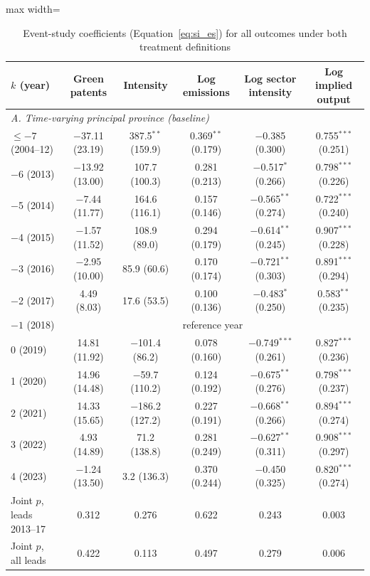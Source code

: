 \begin{table}[htbp]\centering\scriptsize
\caption{Event-study coefficients (Equation~\ref{eq:si_es}) for all outcomes under both treatment definitions}
\label{tab:es}
\begin{adjustbox}{max width=\textwidth}
\begin{tabular}{lccccc}
\toprule
$k$ (year) & Green patents & Intensity & Log emissions & Log sector intensity & Log implied output \\
\midrule
\multicolumn{6}{l}{\textit{A. Time-varying principal province (baseline)}} \\
$\leq-7$ (2004--12) & $-$37.11 (23.19) & 387.5$^{**}$ (159.9) & 0.369$^{**}$ (0.179) & $-$0.385 (0.300) & 0.755$^{***}$ (0.251) \\
$-$6 (2013) & $-$13.92 (13.00) & 107.7 (100.3) & 0.281 (0.213) & $-$0.517$^{*}$ (0.266) & 0.798$^{***}$ (0.226) \\
$-$5 (2014) & $-$7.44 (11.77) & 164.6 (116.1) & 0.157 (0.146) & $-$0.565$^{**}$ (0.274) & 0.722$^{***}$ (0.240) \\
$-$4 (2015) & $-$1.57 (11.52) & 108.9 (89.0) & 0.294 (0.179) & $-$0.614$^{**}$ (0.245) & 0.907$^{***}$ (0.228) \\
$-$3 (2016) & $-$2.95 (10.00) & 85.9 (60.6) & 0.170 (0.174) & $-$0.721$^{**}$ (0.303) & 0.891$^{***}$ (0.294) \\
$-$2 (2017) & 4.49 (8.03) & 17.6 (53.5) & 0.100 (0.136) & $-$0.483$^{*}$ (0.250) & 0.583$^{**}$ (0.235) \\
$-1$ (2018) & \multicolumn{5}{c}{reference year} \\
0 (2019) & 14.81 (11.92) & $-$101.4 (86.2) & 0.078 (0.160) & $-$0.749$^{***}$ (0.261) & 0.827$^{***}$ (0.236) \\
1 (2020) & 14.96 (14.48) & $-$59.7 (110.2) & 0.124 (0.192) & $-$0.675$^{**}$ (0.276) & 0.798$^{***}$ (0.237) \\
2 (2021) & 14.33 (15.65) & $-$186.2 (127.2) & 0.227 (0.191) & $-$0.668$^{**}$ (0.266) & 0.894$^{***}$ (0.274) \\
3 (2022) & 4.93 (14.89) & 71.2 (138.8) & 0.281 (0.249) & $-$0.627$^{**}$ (0.311) & 0.908$^{***}$ (0.297) \\
4 (2023) & $-$1.24 (13.50) & 3.2 (136.3) & 0.370 (0.244) & $-$0.450 (0.325) & 0.820$^{***}$ (0.274) \\
\midrule
Joint $p$, leads 2013--17 & 0.312 & 0.276 & 0.622 & 0.243 & 0.003 \\
Joint $p$, all leads & 0.422 & 0.113 & 0.497 & 0.279 & 0.006 \\

\end{tabular}
\end{adjustbox}
\end{table}
